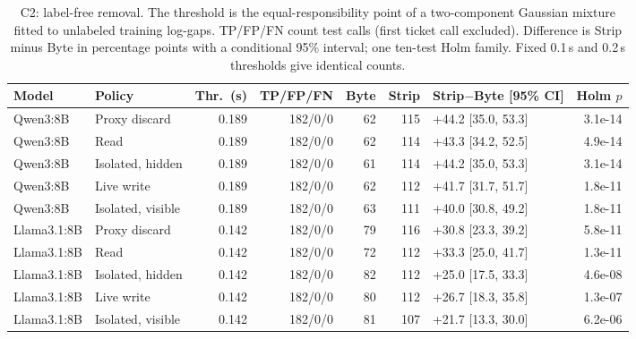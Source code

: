 \begin{table}[t]\centering\small
\caption{C2: label-free removal. The threshold is the equal-responsibility point of a two-component Gaussian mixture fitted to unlabeled training log-gaps. TP/FP/FN count test calls (first ticket call excluded). Difference is Strip minus Byte in percentage points with a conditional 95\% interval; one ten-test Holm family. Fixed 0.1\,s and 0.2\,s thresholds give identical counts.}\label{tab:c2}
\setlength{\tabcolsep}{4pt}
\begin{tabularx}{\textwidth}{@{}llrrrrYr@{}}\toprule
Model & Policy & Thr.\ (s) & TP/FP/FN & Byte & Strip & Strip$-$Byte [95\% CI] & Holm $p$\\\midrule
Qwen3:8B & Proxy discard & 0.189 & 182/0/0 & 62 & 115 & +44.2 [35.0, 53.3] & 3.1e-14 \\
Qwen3:8B & Read & 0.189 & 182/0/0 & 62 & 114 & +43.3 [34.2, 52.5] & 4.9e-14 \\
Qwen3:8B & Isolated, hidden & 0.189 & 182/0/0 & 61 & 114 & +44.2 [35.0, 53.3] & 3.1e-14 \\
Qwen3:8B & Live write & 0.189 & 182/0/0 & 62 & 112 & +41.7 [31.7, 51.7] & 1.8e-11 \\
Qwen3:8B & Isolated, visible & 0.189 & 182/0/0 & 63 & 111 & +40.0 [30.8, 49.2] & 1.8e-11 \\
Llama3.1:8B & Proxy discard & 0.142 & 182/0/0 & 79 & 116 & +30.8 [23.3, 39.2] & 5.8e-11 \\
Llama3.1:8B & Read & 0.142 & 182/0/0 & 72 & 112 & +33.3 [25.0, 41.7] & 1.3e-11 \\
Llama3.1:8B & Isolated, hidden & 0.142 & 182/0/0 & 82 & 112 & +25.0 [17.5, 33.3] & 4.6e-08 \\
Llama3.1:8B & Live write & 0.142 & 182/0/0 & 80 & 112 & +26.7 [18.3, 35.8] & 1.3e-07 \\
Llama3.1:8B & Isolated, visible & 0.142 & 182/0/0 & 81 & 107 & +21.7 [13.3, 30.0] & 6.2e-06 \\
\bottomrule\end{tabularx}
\end{table}
